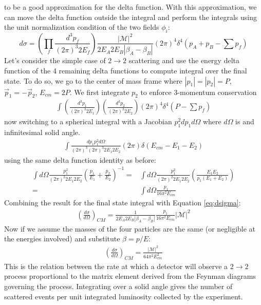to be a good approximation for the delta function. With this approximation, we can move the delta function outside the integral and
perform the integrals using the unit normalization condition of the two fields $\phi_i$:
\begin{equation} \label{eq:dsigma}
d\sigma = \left( \prod_f \frac{d^3p_f}{(2\pi)^3 2E_f} \right ) \frac{|\mathcal{M}|^2}{2E_A2E_B|\beta_A - \beta_B|} (2\pi)^4
\delta^4 \left (p_A+p_B - \sum p_f  \right )
\end{equation}
Let's consider the simple case of $2 \rightarrow 2$ scattering and use the energy delta function 
of the 4 remaining delta functions to compute integral over the final state.
To do so, we go to the center of mass frame where $|p_1| = |p_2|= P$, $\vec p_1 = - \vec p_2$, $E_{cm} = 2P$. We first
integrate $p_2$ to enforce 3-momentum conservation  
\begin{align*}
\int \left( \frac{d^3p_1}{(2\pi)^3 2E_1} \right )\left( \frac{d^3p_2}{(2\pi)^3 2E_2} \right )  (2\pi)^4 \delta^4( P - \sum p_f ) 
\end{align*}
now switching to a spherical integral with a Jacobian $p_1^2 dp_1 d\Omega$ where $d\Omega$ is and infinitesimal solid angle.
\begin{align*}
\int \frac{dp_1 p_1^2 d\Omega}{(2\pi)^3 (2\pi)^3 2E_1 2E_2} (2\pi)\delta( E_{cm} -E_1 - E_2)
\end{align*}
using the same delta function identity as before:
\begin{align*}
\int d\Omega \frac{p_1^2}{(2\pi)^2 2E_1 2E_2} \left ( \frac{p_1}{E_1} + \frac{p_2}{E_2} \right )^{-1} = &\int d\Omega \frac{p_1^2}{(2\pi)^2 2E_1 2E_2} \left ( \frac{E_1E_2}{p_1(E_1+E_2)} \right ) 
\\= &\int d\Omega \frac{p_1}{16\pi^2 E_{cm}}
\end{align*}
Combining the result for the final state integral with Equation \ref{eq:dsigma}:
\begin{align*}
\left (\frac{d\sigma}{d\Omega} \right)_{CM}  = \frac{1}{2E_A2E_B|\beta_A - \beta_B|}  \frac{p_1}{16\pi^2 E_{cm}} |\mathcal{M}|^2
\end{align*}
Now if we assume the masses of the four particles are the same (or negligible at the energies involved) 
and substitute $\beta = p / E$:
\begin{align*}
\left (\frac{d\sigma}{d\Omega}\right)_{CM}  = \frac{|\mathcal{M}|^2}{64\pi^2E_{cm}^2} 
\end{align*}
This is the relation between the rate at which a detector will observe a $2\rightarrow 2$ process proportional to 
the matrix element derived from the Feynman diagrams governing the process. Integrating over a solid angle gives the number of scattered
events per unit integrated luminosity collected by the experiment. 

